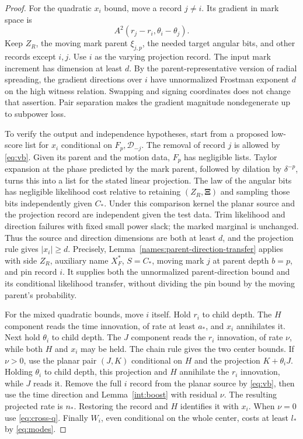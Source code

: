 \begin{proof}
For the quadratic $x_i$ bound, move a record $j\ne i$.
Its gradient in mark space is
\[
 A^2(r_j-r_i,\theta_i-\theta_j).
\]
Keep $Z_R$, the moving mark parent $\xi_{j,p}$, the
needed target angular bits, and other records except
$i,j$. Use $i$ as the varying projection record.
The input mark increment has dimension at least $d$.
By the parent-representative version of radial
spreading, the gradient directions over $i$ have
unnormalized Frostman exponent $d$ on the high
witness relation. Swapping and signing coordinates
does not change that assertion. Pair separation
makes the gradient magnitude nondegenerate up to
subpower loss.

To verify the output and independence hypotheses,
start from a proposed low-score list for $x_i$
conditional on $F_p,\mathcal D_{-j}$. The removal of
record $j$ is allowed by \eqref{eq:vb}. Given its
parent and the motion data, $F_p$ has negligible
lists. Taylor expansion at the phase predicted by
the mark parent, followed by dilation by
$\delta^{-p}$, turns this into a list for the stated
linear projection. The law of the angular bits has
negligible likelihood cost relative to retaining
$(Z_R,\boldsymbol\Xi)$ and sampling those bits
independently given $C_*$. Under this comparison
kernel the planar source and the projection record
are independent given the test data. Trim likelihood
and direction failures with fixed small power slack;
the marked marginal is unchanged. Thus the source
and direction dimensions are both at least $d$,
and the projection rule gives $|x_i|\geq d$.
Precisely, Lemma~\ref{names:parent-direction-transfer}
applies with side $Z_R$, auxiliary name $X_F^*$,
$S=C_*$, moving mark $j$ at parent depth $b=p$,
and pin record $i$. It supplies both the
unnormalized parent-direction bound and its
conditional likelihood transfer, without dividing
the pin bound by the moving parent's probability.

For the mixed quadratic bounds, move $i$ itself.
Hold $r_i$ to child depth. The $H$ component reads
the time innovation, of rate at least $a_*$, and
$x_i$ annihilates it. Next hold $\theta_i$ to child
depth. The $J$ component reads the $r_i$ innovation,
of rate $\nu$, while both $H$ and $x_i$ may be held.
The chain rule gives the two center bounds.
If $\nu>0$, use the planar pair $(J,K)$ conditional
on $H$ and the projection $K+\theta_iJ$. Holding
$\theta_i$ to child depth, this projection and $H$
annihilate the $r_i$ innovation, while $J$ reads it.
Remove the full $i$ record from the planar source
by \eqref{eq:vb}, then use the time direction and
Lemma~\ref{int:boost} with residual $\nu$.
The resulting projected rate is $n_*$. Restoring
the record and $H$ identifies it with $x_i$.
When $\nu=0$ use \eqref{eq:cross-q}. Finally
$W_i$, even conditional on the whole center,
costs at least $l_*$ by \eqref{eq:modes}.


\end{proof}
